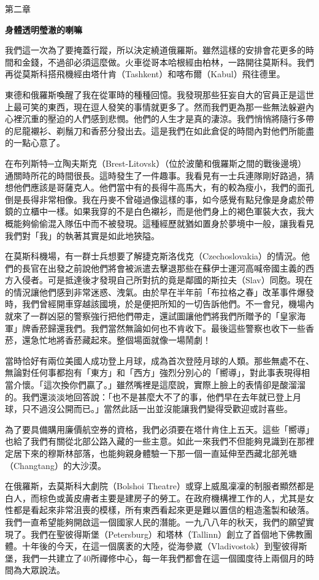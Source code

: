 第二章

\textbf{身體透明瑩澈的喇嘛}

我們這一次為了要掩蓋行蹤，所以決定繞道俄羅斯。雖然這樣的安排會花更多的時間和金錢，不過卻必須這麼做。火車從哥本哈根經由柏林，一路開往莫斯科。我們再從莫斯科搭飛機經由塔什肯（Tashkent）和喀布爾（Kabul）飛往德里。

東德和俄羅斯喚醒了我在從軍時的種種回憶。我發現那些狂妄自大的官員正是這世上最可笑的東西，現在逗人發笑的事情就更多了。然而我們更為那一些無法躲避內心裡沉重的壓迫的人們感到悲憫。他們的人生才是真的淒涼。我們悄悄將隨行多帶的尼龍襯衫、剃鬚刀和香菸分發出去。這是我們在如此倉促的時間內對他們所能盡的一點心意了。

在布列斯特\textbf{─}立陶夫斯克（Brest-Litovsk）（位於波蘭和俄羅斯之間的戰後邊境）通關時所花的時間很長。這時發生了一件趣事。我看見有一士兵連隊剛好路過，猜想他們應該是哥薩克人。他們當中有的長得牛高馬大，有的較為瘦小，我們的面孔倒是長得非常相像。我在丹麥不曾碰過像這樣的事，如今感覺有點兒像是身處於帶鏡的立櫃中一樣。如果我穿的不是白色襯衫，而是他們身上的褐色軍裝大衣，我大概能夠偷偷混入隊伍中而不被發現。這種經歷就猶如置身於夢境中一般，讓我看見我們對「我」的執著其實是如此地狹隘。

在莫斯科機場，有一群士兵想要了解捷克斯洛伐克（Czechoslovakia）的情況。他們的長官在出發之前說他們將會被派遣去擊退那些在蘇伊士運河高喊帝國主義的西方入侵者。可是抵達後才發現自己所對抗的竟是鄰國的斯拉夫（Slav）同胞。現在的情況讓他們感到非常迷惑、洩氣。由於早在半年前「布拉格之春」改革事件爆發時，我們曾經開車穿越該國境，於是便把所知的一切告訴他們。不一會兒，機場內就來了一群凶惡的警察強行把他們帶走，還試圖讓他們將我們所贈予的「皇家海軍」牌香菸歸還我們。我們當然無論如何也不肯收下。最後這些警察也收下一些香菸，還急忙地將香菸藏起來。整個場面就像一場鬧劇！

當時恰好有兩位美國人成功登上月球，成為首次登陸月球的人類。那些無處不在、無論對任何事都抱有「東方」和「西方」強烈分別心的「嚮導」，對此事表現得相當介懷。「這次換你們贏了。」雖然嘴裡是這麼說，實際上臉上的表情卻是酸溜溜的。我們還淡淡地回答說：「也不是甚麼大不了的事，他們早在去年就已登上月球，只不過沒公開而已。」當然此話一出並沒能讓我們變得受歡迎或討喜些。

為了要具備購用廉價航空券的資格，我們必須要在塔什肯住上五天。這些「嚮導」也給了我們有關從北部公路入藏的一些主意。如此一來我們不但能夠見識到在那裡定居下來的穆斯林部落，也能夠親身體驗一下那一個一直延伸至西藏北部羌塘（Changtang）的大沙漠。

在俄羅斯，去莫斯科大劇院（Bolshoi
Theatre）或穿上威風凜凜的制服者顯然都是白人，而棕色或黃皮膚者主要是建房子的勞工。在政府機構裡工作的人，尤其是女性都是看起來非常沮喪的模樣，所有東西看起來更是難以置信的粗造濫製和破落。我們一直希望能夠開啟這一個國家人民的潛能。一九八八年的秋天，我們的願望實現了。我們在聖彼得斯堡（Petersburg）和塔林（Tallinn）創立了首個地下佛教團體。十年後的今天，在這一個廣袤的大陸，從海參崴（Vladivostok）到聖彼得斯堡，我們一共建立了40所禪修中心，每一年我們都會在這一個國度待上兩個月的時間為大眾說法。

